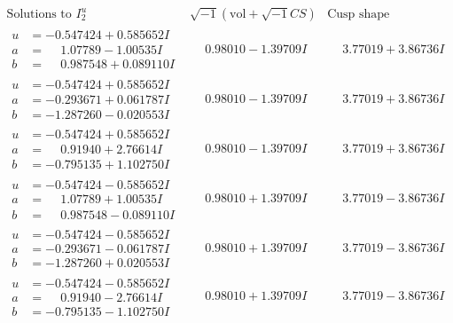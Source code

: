 \documentclass[1p]{elsarticle_modified}
\theoremstyle{definition}
\newcommand{\I}{\sqrt{-1}}
\begin{document}
$$\begin{array}{c|c|c}  
\text{Solutions to }I^u_{2}& \I (\text{vol} + \sqrt{-1}CS) & \text{Cusp shape}\\
 \hline 
\begin{aligned}
u &= -0.547424 + 0.585652 I \\
a &= \phantom{-}1.07789 - 1.00535 I \\
b &= \phantom{-}0.987548 + 0.089110 I\end{aligned}
 & \phantom{-}0.98010 - 1.39709 I & \phantom{-}3.77019 + 3.86736 I \\ \hline\begin{aligned}
u &= -0.547424 + 0.585652 I \\
a &= -0.293671 + 0.061787 I \\
b &= -1.287260 - 0.020553 I\end{aligned}
 & \phantom{-}0.98010 - 1.39709 I & \phantom{-}3.77019 + 3.86736 I \\ \hline\begin{aligned}
u &= -0.547424 + 0.585652 I \\
a &= \phantom{-}0.91940 + 2.76614 I \\
b &= -0.795135 + 1.102750 I\end{aligned}
 & \phantom{-}0.98010 - 1.39709 I & \phantom{-}3.77019 + 3.86736 I \\ \hline\begin{aligned}
u &= -0.547424 - 0.585652 I \\
a &= \phantom{-}1.07789 + 1.00535 I \\
b &= \phantom{-}0.987548 - 0.089110 I\end{aligned}
 & \phantom{-}0.98010 + 1.39709 I & \phantom{-}3.77019 - 3.86736 I \\ \hline\begin{aligned}
u &= -0.547424 - 0.585652 I \\
a &= -0.293671 - 0.061787 I \\
b &= -1.287260 + 0.020553 I\end{aligned}
 & \phantom{-}0.98010 + 1.39709 I & \phantom{-}3.77019 - 3.86736 I \\ \hline\begin{aligned}
u &= -0.547424 - 0.585652 I \\
a &= \phantom{-}0.91940 - 2.76614 I \\
b &= -0.795135 - 1.102750 I\end{aligned}
 & \phantom{-}0.98010 + 1.39709 I & \phantom{-}3.77019 - 3.86736 I \\ \hline\begin{aligned}

\end{aligned}
\end{array}$$
\end{document}
